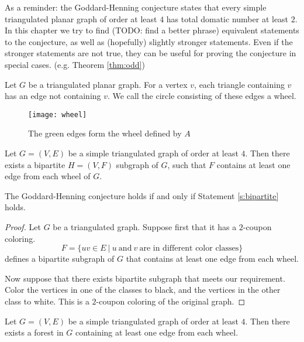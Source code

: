 As a reminder: the Goddard-Henning conjecture states that every simple triangulated
planar graph of order at least $4$ has total domatic number at least $2$. In this
chapter we try to find (TODO: find a better phrase) equivalent statements to the
conjecture, as well as (hopefully) slightly stronger statements. Even if the stronger
statements are not true, they can be useful for proving the conjecture in special cases.
(e.g. Theorem \ref{thm:odd})

\begin{definition}
  Let $G$ be a triangulated planar graph. For a vertex $v$, each triangle
  containing $v$ has an edge not containing $v$. We call the circle consisting of
  these edges a wheel.
\end{definition}

\begin{figure}[ht]
  \centering
  \texttt{[image: wheel]}
  \caption{The green edges form the wheel defined by $A$ }
  \label{fig:wheel}
\end{figure}

\begin{guess}\label{s:bipartite}
  Let $G = (V, E)$ be a simple triangulated graph of order at least $4$. Then there
  exists a bipartite $H = (V, F)$ subgraph of $G$, such that $F$ contains at
  least one edge from each wheel of $G$.
\end{guess}

\begin{claim}
  The Goddard-Henning conjecture holds if and only if Statement \ref{s:bipartite} holds.
\end{claim}
\begin{proof}
  Let $G$ be a triangulated graph. Suppose first that it has a $2$-coupon coloring.
  $$F = \{uv \in E\ |\ u\ \textrm{and}\ v\ \textrm{are in different color classes}\}$$
  defines a bipartite subgraph of $G$ that contains at least one edge from each wheel.

  Now suppose that there exists bipartite subgraph that meets our requirement. Color
  the vertices in one of the classes to black, and the vertices in the other class
  to white. This is a $2$-coupon coloring of the original graph.
\end{proof}

\begin{guess}\label{s:forest}
  Let $G = (V, E)$ be a simple triangulated graph of order at least $4$. Then there
  exists a forest in $G$ containing at least one edge from each wheel.
\end{guess}

